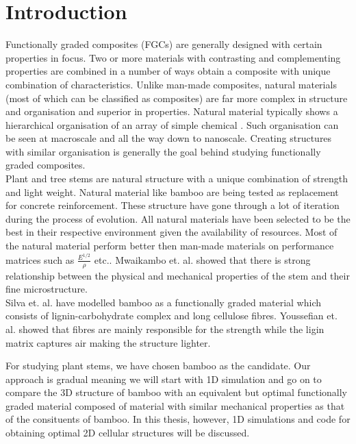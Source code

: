 \documentclass[openright,twoside]{iitkthesis}
\begin{document}
\tableofcontents
\newpage
\listoffigures
\makenomenclature
{}
 
\printnomenclature
\clearpage
\chapter{Introduction}
Functionally graded composites (FGCs) are generally designed with certain properties in focus. Two or more materials with contrasting and complementing properties are combined in a number of ways obtain a composite with unique combination of characteristics. Unlike man-made composites, natural materials (most of which can be classified as composites) are far more complex in structure and organisation and superior in properties. Natural material typically shows a hierarchical organisation of an array of simple chemical\cite{wegst2015bioinspired} . Such organisation can be seen at macroscale and all the way down to nanoscale. Creating structures with similar organisation is generally the goal behind studying functionally graded composites. \\
Plant and tree stems are natural structure with a unique combination of strength and light weight. Natural material like bamboo are being tested as replacement for concrete reinforcement\cite{bhalla2008bamboo}. These structure have gone through a lot of iteration during the process of evolution. All natural materials have been selected to be the best in their respective environment given the availability of resources\cite{nogata1995intelligent}. Most of the natural material perform better then man-made materials on performance matrices such as $\frac{E^{1/2}}{\rho}$ etc.\cite{ashby1995mechanical}\cite{gibson1995mechanical}. Mwaikambo et. al. \cite{mwaikambo2006review} showed that there is strong relationship between the physical and mechanical properties of the stem and their fine microstructure. \\
Silva et. al. \cite{silva2006modeling} have modelled bamboo as a functionally graded material which consists of lignin-carbohydrate complex and long cellulose fibres. Youssefian et. al. \cite{youssefian2015molecular} showed that fibres are mainly responsible for the strength while the ligin matrix captures air making the structure lighter.\par
For studying plant stems, we have chosen bamboo as the candidate. Our approach is gradual meaning we will start with 1D simulation and go on to compare the 3D structure of bamboo with an equivalent but optimal functionally graded material composed of material with similar mechanical properties as that of the consituents of bamboo. In this thesis, however, 1D simulations and code for obtaining optimal 2D cellular structures will be discussed. \par
\end{document}
